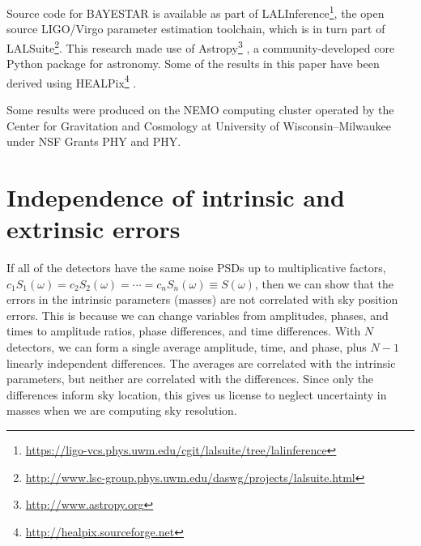 \documentclass[amsmath,amssymb,aps,prx,reprint,nopreprintnumbers,nofootinbib]{revtex4-1}
\begin{document}
Source code for \ac{BAYESTAR} is available as part of LALInference\footnote{\url{https://ligo-vcs.phys.uwm.edu/cgit/lalsuite/tree/lalinference}}, the open source LIGO/Virgo parameter estimation toolchain, which is in turn part of LALSuite\footnote{\url{http://www.lsc-group.phys.uwm.edu/daswg/projects/lalsuite.html}}. This research made use of Astropy\footnote{\url{http://www.astropy.org}} \citep{astropy}, a community-developed core Python package for astronomy. Some of the results in this paper have been derived using \ac{HEALPix}\footnote{\url{http://healpix.sourceforge.net}} \cite{healpix}.

Some results were produced on the NEMO computing cluster operated by the Center for Gravitation and Cosmology at University of Wisconsin\nobreakdashes--Milwaukee under \ac{NSF} Grants PHY and PHY.

\appendix

\section{Independence of intrinsic and extrinsic errors}
\label{sec:independence-intrinsic-extrinsic}

If all of the detectors have the same noise \acp{PSD} up to multiplicative factors, $c_1 S_1(\omega) = c_2 S_2(\omega) = \cdots = c_n S_n(\omega) \equiv S(\omega)$, then we can show that the errors in the intrinsic parameters (masses) are not correlated with sky position errors. This is because we can change variables from amplitudes, phases, and times to amplitude ratios, phase differences, and time differences. With $N$ detectors, we can form a single average amplitude, time, and phase, plus $N-1$ linearly independent differences. The averages are correlated with the intrinsic parameters, but neither are correlated with the differences. Since only the differences inform sky location, this gives us license to neglect uncertainty in masses when we are computing sky resolution.
\end{document}
